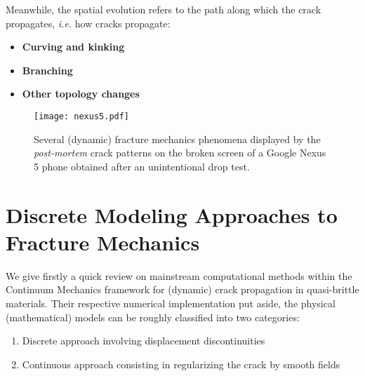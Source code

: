 Meanwhile, the spatial evolution refers to the path along which the crack propagates, \emph{i.e.} how cracks propagate:
\begin{itemize}
\item \textbf{Curving and kinking}
\item \textbf{Branching}
\item \textbf{Other topology changes}
\end{itemize}


\begin{figure}[htbp]
\centering
\texttt{[image: nexus5.pdf]}
\caption{Several (dynamic) fracture mechanics phenomena displayed by the \emph{post-mortem} crack patterns on the broken screen of a Google Nexus 5 phone obtained after an unintentional drop test.}
\end{figure}

\section{Discrete Modeling Approaches to Fracture Mechanics} \label{sec:discretemodels}
We give firstly a quick review on mainstream computational methods within the Continuum Mechanics framework for (dynamic) crack propagation in quasi-brittle materials. Their respective numerical implementation put aside, the physical (mathematical) models can be roughly classified into two categories:
\begin{enumerate}
\item Discrete approach involving displacement discontinuities
\item Continuous approach consisting in regularizing the crack by smooth fields
\end{enumerate}

